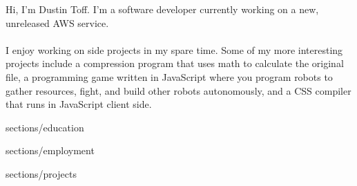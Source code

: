 \customHeader [
    firstName = Dustin,
    lastName = Toff,
    email = me@dustintoff.com,
    phone = +1 (724) 638-7893,
    website = dustintoff.com,
    websiteLink = http://dustintoff.com,
    githubUser = quittle,
]

\parbox {\textwidth} {
    Hi, I'm Dustin Toff. I'm a software developer currently working on a new, unreleased AWS service.
    \\~\\
    I enjoy working on side projects in my spare time. Some of my more interesting projects include a compression program that uses math to calculate the original file, a programming game written in JavaScript where you program robots to gather resources, fight, and build other robots autonomously, and a CSS compiler that runs in JavaScript client side.
}

 { {sections/education}}

 { {sections/employment}}

 { {sections/projects}}
